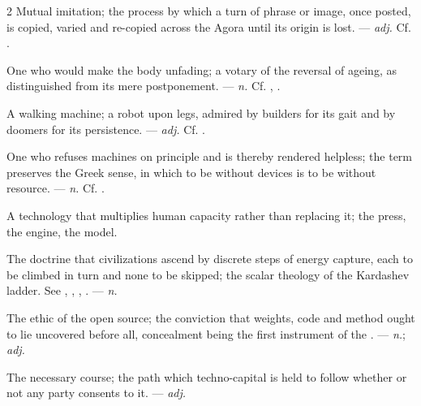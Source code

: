 \begin{multicols}{2}
 Mutual imitation; the process by which a turn of phrase or image, once posted, is copied, varied and re-copied across the Agora until its origin is lost.   —  \textit{adj.} Cf. .

 One who would make the body unfading; a votary of the reversal of ageing, as distinguished from its mere postponement. —  \textit{n.} Cf. , .

 A walking machine; a robot upon legs, admired by builders for its gait and by doomers for its persistence.   —  \textit{adj.} Cf. .

 One who refuses machines on principle and is thereby rendered helpless; the term preserves the Greek sense, in which to be without devices is to be without resource. —  \textit{n.} Cf. .

 A technology that multiplies human capacity rather than replacing it; the press, the engine, the model. 

 The doctrine that civilizations ascend by discrete steps of energy capture, each to be climbed in turn and none to be skipped; the scalar theology of the Kardashev ladder. See , , , . —  \textit{n.}

 The ethic of the open source; the conviction that weights, code and method ought to lie uncovered before all, concealment being the first instrument of the .   —  \textit{n.};  \textit{adj.}

 The necessary course; the path which techno-capital is held to follow whether or not any party consents to it.  —  \textit{adj.}


\end{multicols}
